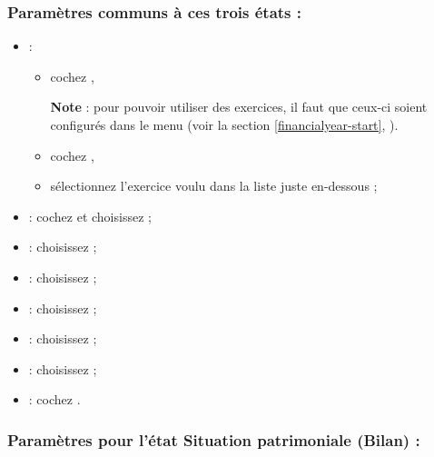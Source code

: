 \subsubsection {Paramètres communs à ces trois états :}

\begin{itemize}
	\item {} :
		\begin{itemize}
			\item cochez ,

			\textbf{Note} : pour pouvoir utiliser des exercices, il faut que ceux-ci soient configurés dans le menu  (voir la section \vref{financialyear-start}, ).
			\item cochez ,
			\item sélectionnez l'exercice voulu dans la liste juste en-dessous ;
		\end{itemize}
	\item {} : cochez  et choisissez  ;
	\item {} : choisissez  ;
	\item {} : choisissez  ;
	\item {} : choisissez  ;
	\item {} : choisissez  ;
	\item {} : choisissez  ;
	\item {} : cochez .		
\end{itemize}	

		
\subsubsection {Paramètres pour l'état Situation patrimoniale (Bilan) :}		
			
